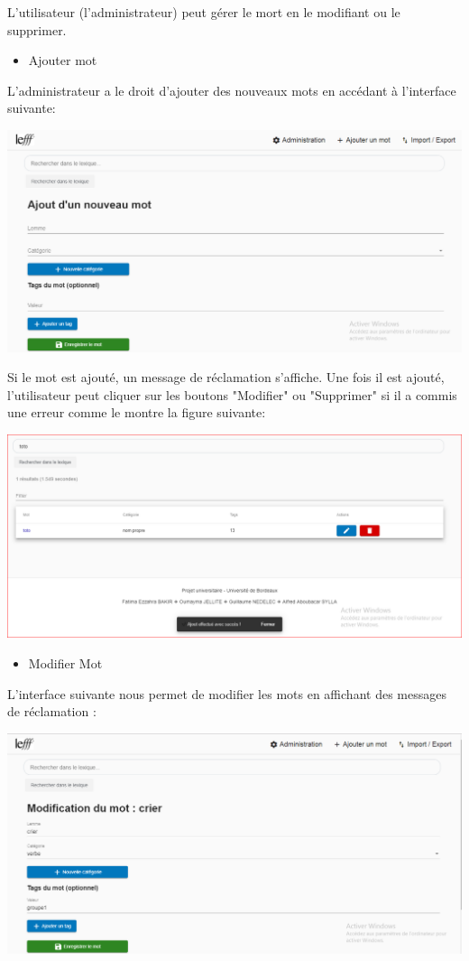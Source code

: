 \documentclass[12pt,a4paper]{article}
\begin{document}
L’utilisateur (l’administrateur) peut gérer le mort en le modifiant ou le supprimer.


\begin{itemize}  
  \item Ajouter mot
\end{itemize}

L'administrateur a le droit d'ajouter des nouveaux mots  en accédant à l'interface suivante: 


\includegraphics[width=150mm]{img/Ajoutermot.PNG}


Si le mot  est ajouté, un message de réclamation s'affiche. Une fois il est ajouté, l'utilisateur peut cliquer sur les boutons "Modifier" ou "Supprimer" si il a commis une erreur comme le montre la figure suivante:


\includegraphics[width=150mm]{img/AjoutEffectuer.PNG}


\begin{itemize}  
  \item Modifier Mot
\end{itemize}
L'interface suivante nous permet de modifier les mots en affichant des messages de réclamation : 

\includegraphics[width=150mm]{img/ModificationMot.PNG}
\end{document}
